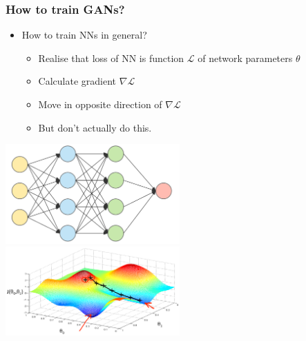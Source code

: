 \documentclass[xcolor=dvipsnames]{beamer}
\begin{document}
\begin{frame}
\frametitle{How to train GANs?}
\begin{itemize}
	\item How to train NNs in general?
	\begin{itemize}
		\item Realise that loss of NN is function $\mathcal{L}$ of network parameters $\theta$
		\item Calculate gradient $\nabla \mathcal{L}$
		\item Move in opposite direction of $\nabla \mathcal{L}$
		\item But don't actually do this.
	\end{itemize}
\end{itemize}
\begin{center}
	\includegraphics[width=0.5\textwidth]{img/NN_small.png}%
	\includegraphics[width=0.5\textwidth]{img/grad_desc.png}
\end{center}
\end{frame}
\end{document}
